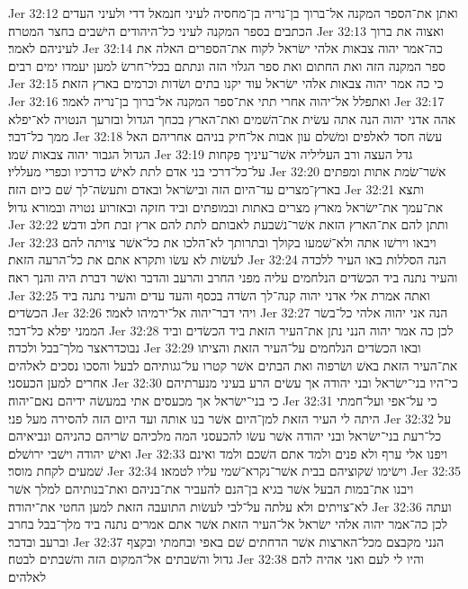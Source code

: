Jer 32:12  ואתן את־הספר המקנה אל־ברוך בן־נריה בן־מחסיה לעיני חנמאל דדי ולעיני העדים הכתבים בספר המקנה לעיני כל־היהודים הישׁבים בחצר המטרה׃
Jer 32:13  ואצוה את ברוך לעיניהם לאמר׃
Jer 32:14  כה־אמר יהוה צבאות אלהי ישׂראל לקוח את־הספרים האלה את ספר המקנה הזה ואת החתום ואת ספר הגלוי הזה ונתתם בכלי־חרשׂ למען יעמדו ימים רבים׃
Jer 32:15  כי כה אמר יהוה צבאות אלהי ישׂראל עוד יקנו בתים ושׂדות וכרמים בארץ הזאת׃
Jer 32:16  ואתפלל אל־יהוה אחרי תתי את־ספר המקנה אל־ברוך בן־נריה לאמר׃
Jer 32:17  אהה אדני יהוה הנה אתה עשׂית את־השׁמים ואת־הארץ בכחך הגדול ובזרעך הנטויה לא־יפלא ממך כל־דבר׃
Jer 32:18  עשׂה חסד לאלפים ומשׁלם עון אבות אל־חיק בניהם אחריהם האל הגדול הגבור יהוה צבאות שׁמו׃
Jer 32:19  גדל העצה ורב העליליה אשׁר־עיניך פקחות על־כל־דרכי בני אדם לתת לאישׁ כדרכיו וכפרי מעלליו׃
Jer 32:20  אשׁר־שׂמת אתות ומפתים בארץ־מצרים עד־היום הזה ובישׂראל ובאדם ותעשׂה־לך שׁם כיום הזה׃
Jer 32:21  ותצא את־עמך את־ישׂראל מארץ מצרים באתות ובמופתים וביד חזקה ובאזרוע נטויה ובמורא גדול׃
Jer 32:22  ותתן להם את־הארץ הזאת אשׁר־נשׁבעת לאבותם לתת להם ארץ זבת חלב ודבשׁ׃
Jer 32:23  ויבאו וירשׁו אתה ולא־שׁמעו בקולך ובתרותך לא־הלכו את כל־אשׁר צויתה להם לעשׂות לא עשׂו ותקרא אתם את כל־הרעה הזאת׃
Jer 32:24  הנה הסללות באו העיר ללכדה והעיר נתנה ביד הכשׂדים הנלחמים עליה מפני החרב והרעב והדבר ואשׁר דברת היה והנך ראה׃
Jer 32:25  ואתה אמרת אלי אדני יהוה קנה־לך השׂדה בכסף והעד עדים והעיר נתנה ביד הכשׂדים׃
Jer 32:26  ויהי דבר־יהוה אל־ירמיהו לאמר׃
Jer 32:27  הנה אני יהוה אלהי כל־בשׂר הממני יפלא כל־דבר׃
Jer 32:28  לכן כה אמר יהוה הנני נתן את־העיר הזאת ביד הכשׂדים וביד נבוכדראצר מלך־בבל ולכדה׃
Jer 32:29  ובאו הכשׂדים הנלחמים על־העיר הזאת והציתו את־העיר הזאת באשׁ ושׂרפוה ואת הבתים אשׁר קטרו על־גגותיהם לבעל והסכו נסכים לאלהים אחרים למען הכעסני׃
Jer 32:30  כי־היו בני־ישׂראל ובני יהודה אך עשׂים הרע בעיני מנערתיהם כי בני־ישׂראל אך מכעסים אתי במעשׂה ידיהם נאם־יהוה׃
Jer 32:31  כי על־אפי ועל־חמתי היתה לי העיר הזאת למן־היום אשׁר בנו אותה ועד היום הזה להסירה מעל פני׃
Jer 32:32  על כל־רעת בני־ישׂראל ובני יהודה אשׁר עשׂו להכעסני המה מלכיהם שׂריהם כהניהם ונביאיהם ואישׁ יהודה וישׁבי ירושׁלם׃
Jer 32:33  ויפנו אלי ערף ולא פנים ולמד אתם השׁכם ולמד ואינם שׁמעים לקחת מוסר׃
Jer 32:34  וישׂימו שׁקוציהם בבית אשׁר־נקרא־שׁמי עליו לטמאו׃
Jer 32:35  ויבנו את־במות הבעל אשׁר בגיא בן־הנם להעביר את־בניהם ואת־בנותיהם למלך אשׁר לא־צויתים ולא עלתה על־לבי לעשׂות התועבה הזאת למען החטי את־יהודה׃
Jer 32:36  ועתה לכן כה־אמר יהוה אלהי ישׂראל אל־העיר הזאת אשׁר אתם אמרים נתנה ביד מלך־בבל בחרב וברעב ובדבר׃
Jer 32:37  הנני מקבצם מכל־הארצות אשׁר הדחתים שׁם באפי ובחמתי ובקצף גדול והשׁבתים אל־המקום הזה והשׁבתים לבטח׃
Jer 32:38  והיו לי לעם ואני אהיה להם לאלהים׃
